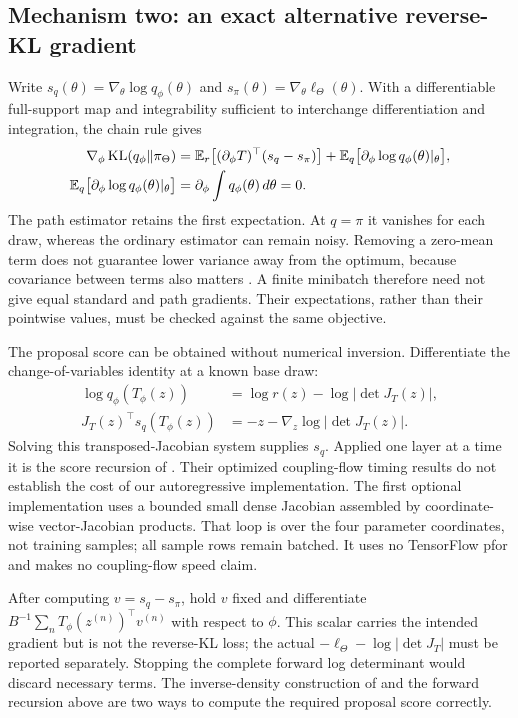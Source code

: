 \subsection{Mechanism two: an exact alternative reverse-KL gradient}

Write $s_q(\theta)=\nabla_\theta\log q_\phi(\theta)$ and
$s_\pi(\theta)=\nabla_\theta\ell_\Theta(\theta)$. With a differentiable
full-support map and integrability sufficient to interchange differentiation
and integration, the chain rule gives
\begin{align}
 \nabla_\phi\operatorname{KL}(q_\phi\Vert\pi_\Theta)
 &=\mathbb{E}_r\big[(\partial_\phi T)^\top(s_q-s_\pi)\big]
   +\mathbb{E}_q\big[\partial_\phi\log q_\phi(\theta)|_\theta\big],\\
 \mathbb{E}_q\big[\partial_\phi\log q_\phi(\theta)|_\theta\big]
 &=\partial_\phi\int q_\phi(\theta)\,d\theta=0.
 \label{eq:bf-q20-path-gradient}
\end{align}
The path estimator retains the first expectation. At $q=\pi$ it vanishes
for each draw, whereas the ordinary estimator can remain noisy. Removing a
zero-mean term does not guarantee lower variance away from the optimum,
because covariance between terms also matters
\citep[Section 2]{roeder2017sticking}. A finite minibatch therefore need not
give equal standard and path gradients. Their expectations, rather than their
pointwise values, must be checked against the same objective.

The proposal score can be obtained without numerical inversion. Differentiate
the change-of-variables identity at a known base draw:
\begin{align}
 \log q_\phi(T_\phi(z))&=\log r(z)-\log|\det J_T(z)|,\\
 J_T(z)^\top s_q(T_\phi(z))&=-z-\nabla_z\log|\det J_T(z)|.
 \label{eq:bf-q20-forward-proposal-score}
\end{align}
Solving this transposed-Jacobian system supplies $s_q$. Applied one layer at
a time it is the score recursion of
\citet[Proposition 3.2 and Appendix B.1]{vaitl2024fastpath}. Their optimized
coupling-flow timing results do not establish the cost of our autoregressive
implementation. The first optional implementation uses a bounded small dense
Jacobian assembled by coordinate-wise vector-Jacobian products. That loop is
over the four parameter coordinates, not training samples; all sample rows
remain batched. It uses no TensorFlow pfor and makes no coupling-flow speed claim.

After computing $v=s_q-s_\pi$, hold $v$ fixed and differentiate
$B^{-1}\sum_n T_\phi(z^{(n)})^\top v^{(n)}$ with respect to $\phi$.
This scalar carries the intended gradient but is not the reverse-KL loss;
the actual $-\ell_\Theta-\log|\det J_T|$ must be reported separately.
Stopping the complete forward log determinant would discard necessary terms.
The inverse-density construction of \citet{vaitl2022path} and the forward
recursion above are two ways to compute the required proposal score correctly.

